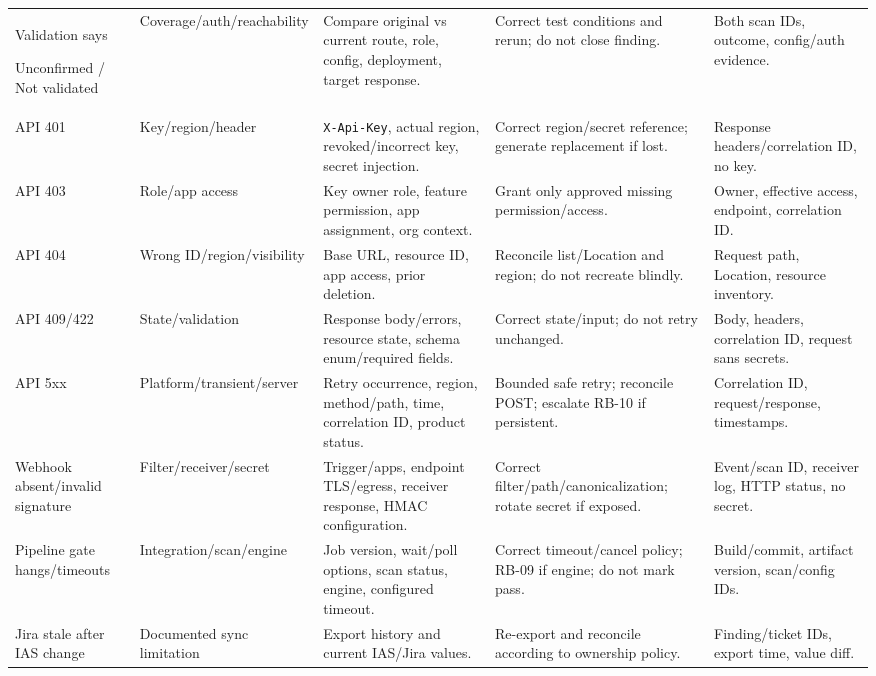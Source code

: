 \documentclass[11pt,letterpaper,oneside]{scrreprt}
\newcommand{\code}[1]{\texttt{#1}}
\begin{document}
\begin{landscape}
\begin{longtable}{@{}P{1.35in}P{1.35in}P{1.75in}P{2.10in}P{1.75in}@{}}
Validation says\par Unconfirmed / Not validated & Coverage/\allowbreak auth/\allowbreak reachability & Compare original vs current route, role, config, deployment, target response. & Correct test conditions and rerun; do not close finding. & Both scan IDs, outcome, config/auth evidence.\\
API 401 & Key/region/header & \code{X-Api-Key}, actual region, revoked/incorrect key, secret injection. & Correct region/secret reference; generate replacement if lost. & Response headers/correlation ID, no key.\\
API 403 & Role/app access & Key owner role, feature permission, app assignment, org context. & Grant only approved missing permission/access. & Owner, effective access, endpoint, correlation ID.\\
API 404 & Wrong ID/region/visibility & Base URL, resource ID, app access, prior deletion. & Reconcile list/Location and region; do not recreate blindly. & Request path, Location, resource inventory.\\
API 409/422 & State/validation & Response body/errors, resource state, schema enum/required fields. & Correct state/input; do not retry unchanged. & Body, headers, correlation ID, request sans secrets.\\
API 5xx & Platform/transient/server & Retry occurrence, region, method/path, time, correlation ID, product status. & Bounded safe retry; reconcile POST; escalate RB-10 if persistent. & Correlation ID, request/response, timestamps.\\
Webhook absent/invalid signature & Filter/receiver/secret & Trigger/apps, endpoint TLS/egress, receiver response, HMAC configuration. & Correct filter/path/canonicalization; rotate secret if exposed. & Event/scan ID, receiver log, HTTP status, no secret.\\
Pipeline gate hangs/timeouts & Integration/scan/engine & Job version, wait/poll options, scan status, engine, configured timeout. & Correct timeout/cancel policy; RB-09 if engine; do not mark pass. & Build/commit, artifact version, scan/config IDs.\\
Jira stale after IAS change & Documented sync limitation & Export history and current IAS/Jira values. & Re-export and reconcile according to ownership policy. & Finding/ticket IDs, export time, value diff.\\
\bottomrule
\end{longtable}
\normalsize
\end{landscape}
\end{document}
